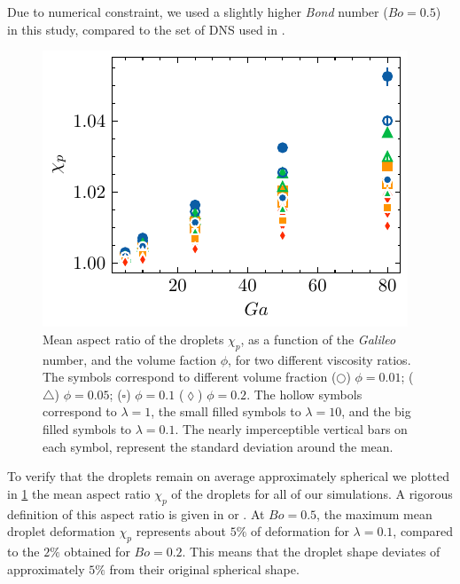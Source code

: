 Due to numerical constraint, we used a slightly higher \textit{Bond} number ($Bo = 0.5$) in this study, compared to the set of DNS used in \citet{fintzi2024buoyancy}. 
\begin{figure}[h!]
    \centering
    \includegraphics[height = 0.3\textwidth]{image/HOMOGENEOUS_final/PA/chi.pdf}
    \caption{Mean aspect ratio of the droplets $\chi_p$, as a function of the \textit{Galileo} number, and the volume faction $\phi$,  for two different viscosity ratios.  
    The symbols correspond to different volume fraction ($\pmb\bigcirc$) $\phi = 0.01$; ($\pmb\triangle$) $ \phi = 0.05$; ($\pmb\square$) $\phi = 0.1$ ($\pmb\lozenge$) $\phi = 0.2$.
    The hollow symbols correspond to $\lambda = 1$, the small filled symbols to $\lambda = 10$, and the big filled symbols to $\lambda = 0.1$.
    The nearly imperceptible vertical bars on each symbol, represent the standard deviation around the mean.  }
    \label{fig:chi2}
\end{figure}
To verify that the droplets remain on average approximately spherical we plotted in \ref{fig:chi2} the mean aspect ratio $\chi_p$ of the droplets for all of our simulations. 
A rigorous definition of this aspect ratio is given in \citet[Appendix 1]{fintzi2024buoyancy} or \citet{bunner2003effect}. 
At $Bo = 0.5$, the maximum mean droplet deformation $\chi_p$ represents about $5\%$ of deformation for $\lambda = 0.1$, compared to the $2\%$ obtained for $Bo = 0.2$. 
This means that the droplet shape deviates of approximately $5\%$ from their original spherical shape. 


